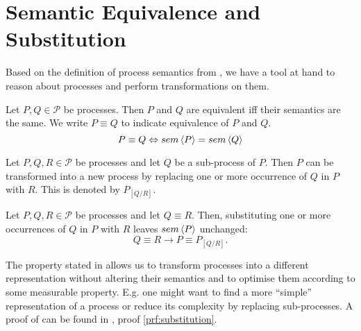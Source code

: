 \clearpage
\section{Semantic Equivalence and Substitution}
\label{chp:semantic_equivalence}
Based on the definition of process semantics from , we have a tool at hand to reason about processes and perform transformations on them.

\begin{definition}
\label{def:process_equivalence}
Let $P, Q \in \mathcal{P}$ be processes. Then $P$ and $Q$ are equivalent iff their semantics are the same. We write $P \equiv Q$ to indicate equivalence of $P$ and $Q$.
  \begin{equation*}
    \label{eqn:equivalence}
    P \equiv Q \Leftrightarrow sem \left\langle P \right\rangle = sem \left\langle Q \right\rangle
  \end{equation*}
  \hfill\qedsymbol
\end{definition}


\begin{definition}
\label{def:process_substitution}
Let $P, Q, R \in \mathcal{P}$ be processes and let $Q$ be a sub-process of $P$. Then $P$ can be transformed into a new process by replacing one or more occurrence of $Q$ in $P$ with $R$. This is denoted by $P_{\left[ Q / R \right]}$.

\hfill\qedsymbol
\end{definition}


\begin{theorem}
\label{thm:process_substitution}
Let $P, Q, R \in \mathcal{P}$ be processes and let $Q \equiv R$. Then, substituting one or more occurrences of $Q$ in $P$ with $R$ leaves $sem \left\langle P \right\rangle$ unchanged:
  \begin{equation*}
    Q \equiv R \rightarrow P \equiv P_{\left[ Q / R \right]}.
  \end{equation*}
  
  \hfill\qedsymbol
\end{theorem}


The property stated in  allows us to transform processes into a different representation without altering their semantics and to optimise them according to some measurable property. E.g. one might want to find a more \enquote{simple} representation of a process or reduce its complexity by replacing sub-processes. A proof of  can be found in , proof \ref{prf:substitution}.

